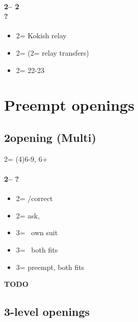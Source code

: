 \documentclass[12pt, a4paper]{report}
\begin{document}
{{        \subsubsection*{2\clubs -- 2\diams\\
                        ?}
        \begin{itemize}
            \item 2\hearts = Kokish relay
            \item 2\spades = \nat (2\nt = relay \then transfers)
            \item 2\nt = 22-23 \bal\ \nf
        \end{itemize}
    }

    \chapter*{\colorbox{Plum!30}{Preempt openings}}
     {

        \section*{\colorbox{blue!30}{2\diams opening (Multi)}}
         {
            2\diams = (4)6-9, 6+\major

            \subsubsection*{2\diams -- ?}
            \begin{itemize}
                \item 2\major = \pass/correct
                \item 2\nt = ask, \invp
                \item 3\clubs = \gf\ own suit
                \item 3\diams = \inv\ both fits
                \item 3\hearts = preempt, both fits
            \end{itemize}

            {\color{red}\textbf{TODO}}
        }

        \section*{\colorbox{blue!30}{3-level openings}}
         {
        
}}}
\end{document}

